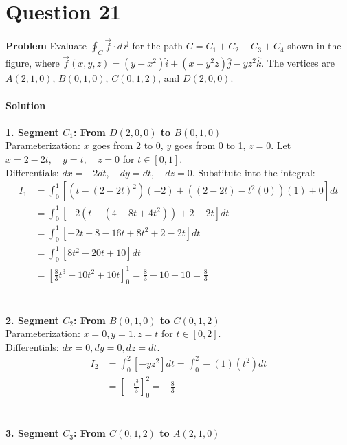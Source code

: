 \documentclass{article}
\begin{document}
\pagebreak


\section{Question 21}
\textbf{Problem}
Evaluate $\oint_C \vec{f} \cdot d\vec{r}$ for the path
$C = C_1 + C_2 + C_3 + C_4$ shown in the figure, where
$\vec{f}(x,y,z) = (y-x^2)\hat{i} + (x-y^2z)\hat{j} - yz^2\hat{k}$. The vertices
are $A(2,1,0)$, $B(0,1,0)$, $C(0,1,2)$, and $D(2,0,0)$.
\\
\\
\textbf{Solution}
\\
\\
\textbf{1. Segment $C_1$: From $D(2,0,0)$ to $B(0,1,0)$}
\\
Parameterization: $x$ goes from 2 to 0, $y$ goes from 0 to 1, $z=0$.
Let $x = 2 - 2t, \quad y = t, \quad z = 0$ for $t \in [0, 1]$.
\\
Differentials: $dx = -2dt, \quad dy = dt, \quad dz = 0$.
Substitute into the integral:
\begin{align*}
	I_1 & = \int_0^1 \left[ (t - (2-2t)^2)(-2) + ((2-2t) - t^2(0))(1) + 0 \right] dt              \\
	    & = \int_0^1 \left[ -2(t - (4 - 8t + 4t^2)) + 2 - 2t \right] dt                           \\
	    & = \int_0^1 \left[ -2t + 8 - 16t + 8t^2 + 2 - 2t \right] dt                              \\
	    & = \int_0^1 \left[ 8t^2 - 20t + 10 \right] dt                                            \\
	    & = \left[ \frac{8}{3}t^3 - 10t^2 + 10t \right]_0^1 = \frac{8}{3} - 10 + 10 = \frac{8}{3}
\end{align*}
\\
\\
\textbf{2. Segment $C_2$: From $B(0,1,0)$ to $C(0,1,2)$}
\\
Parameterization: $x=0, y=1, z=t$ for $t \in [0, 2]$.
\\
Differentials: $dx=0, dy=0, dz=dt$.
\begin{align*}
	I_2 & = \int_0^2 \left[ -yz^2 \right] dt = \int_0^2 -(1)(t^2) dt \\
	    & = \left[ -\frac{t^3}{3} \right]_0^2 = -\frac{8}{3}
\end{align*}
\\
\\
\textbf{3. Segment $C_3$: From $C(0,1,2)$ to $A(2,1,0)$}
\\
\end{document}
